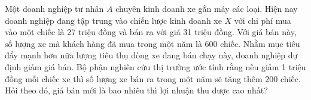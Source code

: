 \begin{ex}
    Một doanh nghiệp tư nhân $A$ chuyên kinh doanh xe gắn máy các loại. Hiện nay doanh nghiệp đang tập trung vào chiến lược kinh doanh xe $X$ với chi phí mua vào một chiếc là 27 triệu đồng và bán ra với giá 31 triệu đồng. Với giá bán này, số lượng xe mà khách hàng đã mua trong một năm là 600 chiếc. Nhằm mục tiêu đẩy mạnh hơn nữa lượng tiêu thụ dòng xe đang bán chạy này, doanh nghiệp dự định giảm giá bán. Bộ phận nghiên cứu thị trường ước tính rằng nếu giảm 1 triệu đồng mỗi chiếc xe thì số lượng xe bán ra trong một năm sẽ tăng thêm 200 chiếc. Hỏi theo đó, giá bán mới là bao nhiêu thì lợi nhuận thu được cao nhất?
    \shortans{}
\end{ex}
